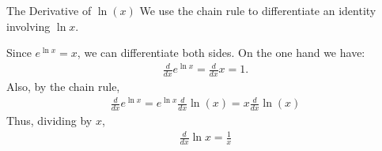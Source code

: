 \documentclass{beamer}
\begin{document}
\begin{frame}{The Derivative of $\ln(x)$}
 We use the chain rule to differentiate an identity involving $\ln x$.  
 
 Since $e^{\ln x}  = x$, we can differentiate both sides.  On the one hand we have:
\begin{align*}
 \frac{d}{dx}e^{\ln x} = \frac{d}{dx} x = 1.
\end{align*}
Also, by the chain rule, 
\begin{align*}
 \frac{d}{dx}e^{\ln x} = e^{\ln x} \frac{d}{dx}\ln(x) = x \frac{d}{dx}\ln(x)
\end{align*}
Thus, dividing by $x$,
\begin{align*}
 \frac{d}{dx}\ln x = \frac1x
\end{align*}



\end{frame}
\begin{frame}{}
 
\end{frame}
\begin{frame}{}
 
\end{frame}
\begin{frame}{}
 
\end{frame}
\begin{frame}{}
 
\end{frame}
\begin{frame}{}
 
\end{frame}
\begin{frame}{}
 
\end{frame}
\end{document}

